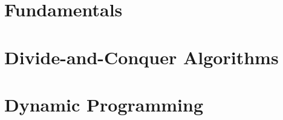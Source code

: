 \documentclass{book}
\newcommand{\LoadSection}[1]{{}}
\begin{document}
\thispagestyle{plain}
\MakeCustomTitle
\bigskip


\begin{center}%
    \parbox{0.7\textwidth}{\doclicenseThis}%
\end{center}

{
    \hypersetup{linkcolor=black}
    \tableofcontents
}

\newpage
\mainmatter

\chapter{Fundamentals}%
\label{cha:fundamentals}

    \LoadSection{fundamentals/performance-and-big-o}
    \LoadSection{fundamentals/dynamic-arrays}
    \LoadSection{fundamentals/array-search-algorithms}
    \LoadSection{fundamentals/sorting-algorithms}
    \LoadSection{fundamentals/linked-lists}
    \LoadSection{fundamentals/bsts}
    \newpage
    \LoadSection{fundamentals/binary-heaps/intro}
    \newpage
    \LoadSection{fundamentals/binary-heaps/array-indexing}
    \newpage
    \LoadSection{fundamentals/binary-heaps/push}
    \newpage
    \LoadSection{fundamentals/binary-heaps/pop}
    \newpage
    \LoadSection{fundamentals/binary-heaps/pushpop}
    \newpage
    \LoadSection{fundamentals/binary-heaps/heapify}
    \newpage
    \LoadSection{fundamentals/binary-heaps/further-reading}
    \LoadSection{fundamentals/binary-heaps/references}
    \newpage
    \LoadSection{fundamentals/tries}
    \LoadSection{fundamentals/hash-tables}
    \LoadSection{fundamentals/graphs}

\newpage
\chapter{Divide-and-Conquer Algorithms}%
\label{cha:doc}

    \LoadSection{divide-and-conquer/intro}
    \LoadSection{divide-and-conquer/karatsuba-multiplication}
    \LoadSection{divide-and-conquer/fft}

\newpage
\chapter{Dynamic Programming}
\label{cha:dp}

    \LoadSection{dynamic-programming/intro}
    \LoadSection{dynamic-programming/fibonacci-sequence}
    \LoadSection{dynamic-programming/01-knapsack-problem}
\end{document}

